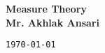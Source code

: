 \documentclass[12pt, a4paper]{article} %
\begin{document}
\begin{titlepage}
    \begin{center}
        \vspace*{1cm}
        \Large{\textbf{Measure Theory}}\\ 
        \Large{\bf Mr. Akhlak Ansari}
        \vfill %

        {\tt \today}\\
    \end{center}
\end{titlepage}

\tableofcontents
\thispagestyle{empty}
\clearpage

\setcounter{page}{1}

\vspace*{0.5cm}
\end{document}
